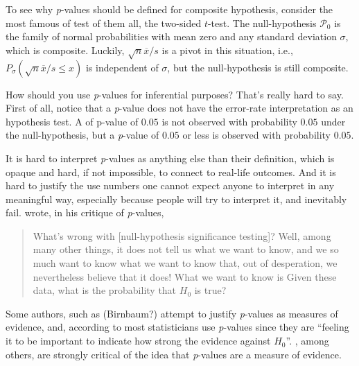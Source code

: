To see why \emph{p}-values should be defined for composite hypothesis,
consider the most famous of test of them all, the two-sided $t$-test.
The null-hypothesis $\mathcal{P}_{0}$ is the family of normal probabilities
with mean zero and any standard deviation $\sigma$, which is composite.
Luckily, $\sqrt{n}\overline{x}/s$ is a pivot in this situation, i.e.,
$P_{\sigma}(\sqrt{n}\overline{x}/s\leq x)$ is independent of $\sigma$,
but the null-hypothesis is still composite. 

How should you use \emph{p}-values for inferential purposes? That's
really hard to say. First of all, notice that a \emph{p}-value does
not have the error-rate interpretation as an hypothesis test. A of
p-value of $0.05$ is not observed with probability $0.05$ under
the null-hypothesis, but a \emph{p}-value of $0.05$ or less is observed
with probability $0.05$. 

It is hard to interpret \emph{p}-values as anything else than their
definition, which is opaque and hard, if not impossible, to connect
to real-life outcomes. And it is hard to justify the use numbers one
cannot expect anyone to interpret in any meaningful way, especially
because people will try to interpret it, and inevitably fail. \textcite{Cohen1994-au}
wrote, in his critique of \emph{p}-values, 
\begin{verse}
What's wrong with {[}null-hypothesis significance testing{]}? Well,
among many other things, it does not tell us what we want to know,
and we so much want to know what we want to know that, out of desperation,
we nevertheless believe that it does! What we want to know is \textquotedbl Given
these data, what is the probability that $H_{0}$ is true?\textquotedbl{}
\end{verse}
Some authors, such as (Birnbaum?) attempt to justify \emph{p}-values
as measures of evidence, and, according to \textcite{Berger1987-tf}
most statisticians use \emph{p}-values since they are ``feeling it
to be important to indicate how strong the evidence against $H_{0}$''.
\textcite{Hubbard2008-cg}, among others, are strongly critical of the
idea that \emph{p}-values are a measure of evidence.

